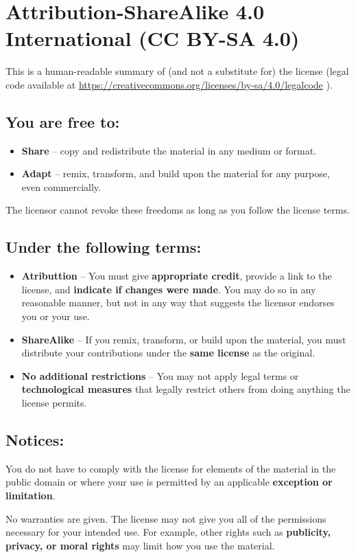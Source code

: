 \chapter*{Attribution-ShareAlike 4.0 International (CC BY-SA 4.0)}

This is a human-readable summary of (and not a substitute for) the license
(legal code available at
\url{https://creativecommons.org/licenses/by-sa/4.0/legalcode}
).

\section*{You are free to:}

\begin{itemize}

\item \textbf{Share} --
copy and redistribute the material in any medium or format.

\item \textbf{Adapt} -- 
remix, transform, and build upon the material
for any purpose, even commercially. 

\end{itemize}

The licensor cannot revoke these freedoms as long as you follow the license terms.

\section*{Under the following terms:}

\begin{itemize}

\item \ccAttribution \quad \textbf{Atributtion} --
You must give \textbf{appropriate credit}, provide a link to the license, 
and \textbf{indicate if changes were made}. 
You may do so in any reasonable manner, but not in any
way that suggests the licensor endorses you or your use.


\item \ccShareAlike \quad \textbf{ShareAlike} --
If you remix, transform, or build upon the material, you must distribute your
contributions under the \textbf{same license} as the original. 

\item \textbf{No additional restrictions} --
You may not apply legal terms or \textbf{technological measures} 
that legally restrict others from doing anything the license permits. 

\end{itemize}

\section*{Notices:}

You do not have to comply with the license for elements of the material in the
public domain or where your use is permitted by an applicable 
\textbf{exception or limitation}.

No warranties are given. The license may not give you all of the permissions
necessary for your intended use. For example, other rights such as 
\textbf{publicity, privacy, or moral rights} may limit how you use the material.
